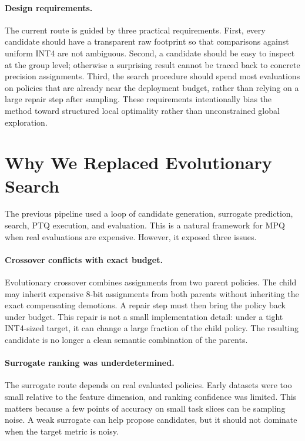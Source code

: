 \documentclass{article}
\begin{document}
\paragraph{Design requirements.}
The current route is guided by three practical requirements. First, every candidate should have a transparent raw footprint so that comparisons against uniform INT4 are not ambiguous. Second, a candidate should be easy to inspect at the group level; otherwise a surprising result cannot be traced back to concrete precision assignments. Third, the search procedure should spend most evaluations on policies that are already near the deployment budget, rather than relying on a large repair step after sampling. These requirements intentionally bias the method toward structured local optimality rather than unconstrained global exploration.

\section{Why We Replaced Evolutionary Search}

The previous pipeline used a loop of candidate generation, surrogate prediction, search, PTQ execution, and evaluation. This is a natural framework for MPQ when real evaluations are expensive. However, it exposed three issues.

\paragraph{Crossover conflicts with exact budget.}
Evolutionary crossover combines assignments from two parent policies. The child may inherit expensive 8-bit assignments from both parents without inheriting the exact compensating demotions. A repair step must then bring the policy back under budget. This repair is not a small implementation detail: under a tight INT4-sized target, it can change a large fraction of the child policy. The resulting candidate is no longer a clean semantic combination of the parents.

\paragraph{Surrogate ranking was underdetermined.}
The surrogate route depends on real evaluated policies. Early datasets were too small relative to the feature dimension, and ranking confidence was limited. This matters because a few points of accuracy on small task slices can be sampling noise. A weak surrogate can help propose candidates, but it should not dominate when the target metric is noisy.
\end{document}

